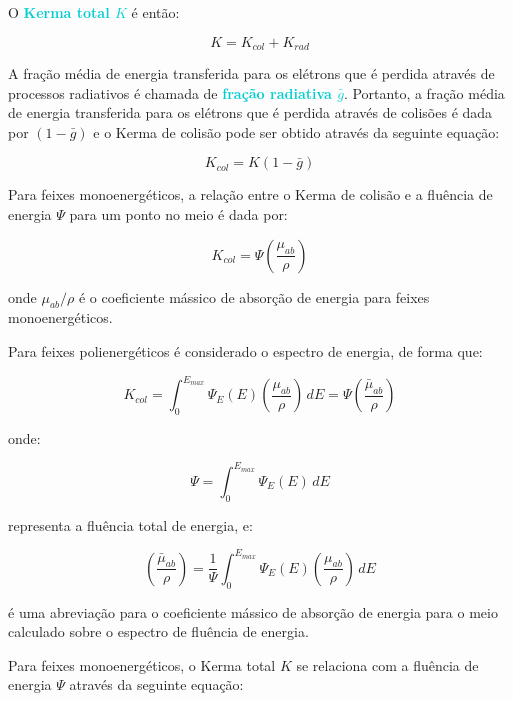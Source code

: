 \documentclass[11pt,a4paper]{article}
\begin{document}
		O \textcolor{DarkTurquoise}{\textbf{Kerma total $K$}} é então:

			\begin{equation}
				K = K_{col} + K_{rad}
			\end{equation}

		A fração média de energia transferida para os elétrons que é perdida através de processos radiativos é chamada de \textcolor{DarkTurquoise}{\textbf{fração radiativa $\bar{g}$}}. Portanto, a fração média de energia transferida para os elétrons que é perdida através de colisões é dada por $(1 - \bar{g})$ e o Kerma de colisão pode ser obtido através da seguinte equação:

			\begin{equation}
				K_{col} = K(1 - \bar{g})
			\end{equation}

		Para feixes monoenergéticos, a relação entre o Kerma de colisão e a fluência de energia $\Psi$ para um ponto no meio é dada por:

			\begin{equation}
				K_{col} = \Psi \left(\frac{\mu_{ab}}{\rho}\right)
			\end{equation}

		\noindent onde $\mu_{ab}/\rho$ é o coeficiente mássico de absorção de energia para feixes monoenergéticos. 

		Para feixes polienergéticos é considerado o espectro de energia, de forma que:

			\begin{equation}
				K_{col} = \int_{0}^{E_{max}} \Psi_E(E) \left(\frac{\mu_{ab}}{\rho}\right)  \,dE 
				= \Psi \left(\frac{\bar{\mu}_{ab}}{\rho}\right)
			\end{equation}

		\noindent onde:

			$$\Psi = \int_{0}^{E_{max}} \Psi_E(E) \, dE$$

		\noindent representa a fluência total de energia, e:

			$$\left(\frac{\bar{\mu}_{ab}}{\rho}\right)
			= \frac{1}{\Psi} \int_{0}^{E_{max}} \Psi_E(E) \left(\frac{\mu_{ab}}{\rho}\right)  \,dE
			$$

		\noindent é uma abreviação para o coeficiente mássico de absorção de energia para o meio calculado sobre o espectro de fluência de energia.


		Para feixes monoenergéticos, o Kerma total $K$ se relaciona com a fluência de energia $\Psi$ através da seguinte equação:
\end{document}
